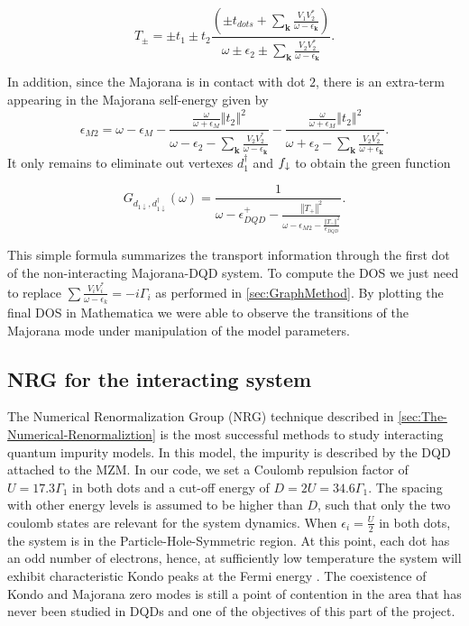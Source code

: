 \begin{equation}
    T_{\pm}=\pm t_{1}\pm t_{2}\frac{\left(\pm t_{dots}+\sum_{\mathbf{k}}\frac{V_{1}V_{2}^{*}}{\omega-\epsilon_{\mathbf{k}}}\right)}{\omega\pm\epsilon_{2}\pm\sum_{\mathbf{k}}\frac{V_{2}V_{2}^{*}}{\omega-\epsilon_{\mathbf{k}}}}. \label{eq:T+-}
\end{equation}

\noindent In addition, since the Majorana is in contact with dot $2$, there is an extra-term appearing in the  Majorana self-energy given by 
\begin{equation}
    \epsilon_{M2}=\omega-\epsilon_{M}-\frac{\frac{\omega}{\omega+\epsilon_{M}}\left\Vert t_{2}\right\Vert ^{2} } {\omega-\epsilon_{2}-\sum_{\mathbf{k}}\frac{V_{2}V_{2}^{*}}{\omega-\epsilon_{\mathbf{k}}}}-\frac{\frac{\omega}{\omega+\epsilon_{M}}\left\Vert t_{2}\right\Vert ^{2}}{\omega+\epsilon_{2}-\sum_{\mathbf{k}}\frac{V_{2}V_{2}^{*}}{\omega+\epsilon_{\mathbf{k}}}}. \label{eq:M2}
\end{equation}
It only remains to eliminate out vertexes $d^\dagger_1$ and $f_\downarrow$  to obtain the green function 

\begin{equation}
    G_{{d_{1\downarrow},d_{1\downarrow}^{\dagger}}}\left(\omega\right)=\frac{1}{\omega-\epsilon_{DQD}^{+}-\frac{\left\Vert T_{+}\right\Vert ^{2}}{\omega-\epsilon_{M2}-\frac{\left\Vert T_{-}\right\Vert ^{2}}{\epsilon_{DQD}^{-}}}}.
    \label{eq:Green_NonInteracting}
\end{equation}

This simple formula summarizes the transport information through the first dot of the non-interacting Majorana-DQD system.  To compute the DOS we just need to replace  $\sum \frac{V_iV^*_i}{\omega -\epsilon_k}= -i\Gamma_i$ as performed in \ref{sec:GraphMethod}. By plotting the final DOS in Mathematica we were able to observe the transitions of the Majorana mode under manipulation of the model parameters.  


\subsection{NRG for the interacting system}

The Numerical Renormalization Group (NRG) technique described in \ref{sec:The-Numerical-Renormaliztion} is the most successful methods to study interacting quantum impurity models. In this model, the impurity is described by the DQD attached to the MZM. In our code, we set a Coulomb repulsion factor of $U =17.3\Gamma_1$ in both dots and a cut-off energy of $D=2U=34.6\Gamma_1$. The spacing with other energy levels is assumed to be higher than $D$, such that only the two coulomb states are relevant for the system dynamics.  When  $\epsilon_i = \frac{U}{2}$ in both dots, the system is in the Particle-Hole-Symmetric region. At this point, each dot has an odd number of electrons, hence, at sufficiently low temperature the system will exhibit characteristic Kondo peaks at the Fermi energy \cite{wilson_renormalization_1975}. The coexistence of Kondo and Majorana zero modes is still a point of contention in the area that has never been studied in DQDs and one of the objectives of this part of the project.


